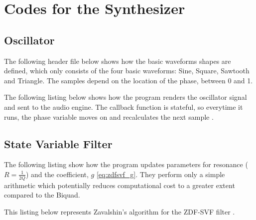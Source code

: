 \section{Codes for the Synthesizer}
\label{app:synth_Code}

\subsection{Oscillator}

The following header file below shows how the basic waveforms shapes are defined, which only consists
of the four basic waveforms: Sine, Square, Sawtooth and Triangle. The samples depend on the location of the
phase, between 0 and 1.



The following listing below shows how the program renders the oscillator signal and sent to the audio engine.
The callback function is stateful, so everytime it runs, the phase variable moves on and recalculates the next
sample \cite{openai_chatgpt}.



\subsection{State Variable Filter}
\label{app:synth_code}

The following listing show how the program updates parameters for resonance ($R = \frac{1}{2Q}$) and the
coefficient, $g$ \eqref{eq:zdfsvf_g}. They perform only a simple arithmetic which potentially reduces
computational cost to a greater extent compared to the Biquad.



This listing below represents Zavalshin's algorithm for the ZDF-SVF filter
\cite{vafilterdesign2021}.



